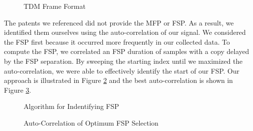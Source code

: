 \documentclass[conference,onecolumn]{IEEEtran}
\begin{document}
\begin{figure}[H]
	\centerline{}
	\caption{TDM Frame Format \cite{a2008_us8260192b2}}
	\label{fig::tdm_frame_format}
\end{figure}

The patents we referenced did not provide the MFP or FSP. As a result, we identified them ourselves using the auto-correlation of our signal. We considered the FSP first because it occurred more frequently in our collected data. To compute the FSP, we correlated an FSP duration of samples with a copy delayed by the FSP separation. By sweeping the starting index until we maximized the auto-correlation, we were able to effectively identify the start of our FSP. Our approach is illustrated in Figure \ref{fig::finding_fsp} and the best auto-correlation is shown in Figure \ref{fig::fsp_correlation}.

\begin{figure}[H]
	\centerline{}
	\caption{Algorithm for Indentifying FSP}
	\label{fig::finding_fsp}
\end{figure}

\begin{figure}[H]
	\centerline{}
	\caption{Auto-Correlation of Optimum FSP Selection}
	\label{fig::fsp_correlation}
\end{figure}
\end{document}
